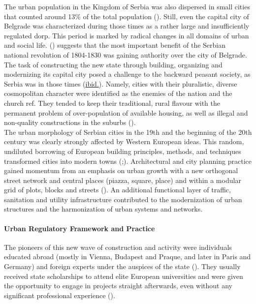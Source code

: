 \documentclass[11pt]{report}
\begin{document}
{{{{The  urban  population  in  the  Kingdom  of  Serbia  was  also dispersed  in  small  cities that counted around 13\% of the total population (\href{Kraljevina Jugoslavija}{\citealt{drzavna_statistika_kraljevine_jugoslavije_definitivni_1932}}). Still, even the capital city of Belgrade was characterized during those times as a rather large and insufficiently regulated dorp.  This period is marked by radical changes in all domains of urban and social life.
(\href{Samardzic}{\citealt{doytchinov_belgrade_2015}}) suggests that the most important benefit of the Serbian national revolution of 1804-1830 was gaining authority over the city of Belgrade. The task of constructing the new state through building, organizing and modernizing its capital city posed a challenge to the backward peasant society, as Serbia was in those times  (\href{Samardzic}{ibid.}). Namely, cities with their pluralistic, diverse cosmopolitan character were identified as the enemies of the nation and the church ref. They tended to keep their traditional, rural flavour with the permanent problem of over-population of available housing, as well as illegal and non-quality constructions in the suburbs (\href{Doytchinov}{\citealt{doytchinov_modernization_2015}}).
\\  

The urban morphology of Serbian cities in the 19th and the beginning of the 20th century was clearly strongly affected by Western European ideas. This random, undiluted borrowing of European building principles, methods, and techniques transformed cities into modern towns  (\href{Nedovic}{\citealt{nedovicbudic_waves_2006}};\href{Kadijevic}{\citealt{kadijevic_jedan_2007}}). Architectural and city planning practice gained momentum from an emphasis on urban growth with a new orthogonal street network and central places (piazza, square, place) and within a modular grid of plots, blocks and streets (\href{Kadijevic}{\citealt{kadijevic_jedan_2007}}). An additional functional layer of traffic, sanitation and utility infrastructure contributed to the modernization of urban structures and the harmonization of urban systems and networks.

\paragraph{Urban Regulatory Framework and Practice}

The pioneers of this new wave of construction and activity were individuals educated abroad (mostly in Vienna, Budapest and Praque, and later in Paris and Germany) and foreign experts under the auspices of the state (\href{Maksimovic}{\citealt{maksimovic_idejni_1978}}). They usually received state scholarships to attend elite European universities and were given the opportunity to engage in projects straight afterwards, even without any significant professional experience (\href{Mladjenovic}{\citealt{mladjenovic_novija_2010}}).
\\

}}}}
\end{document}
